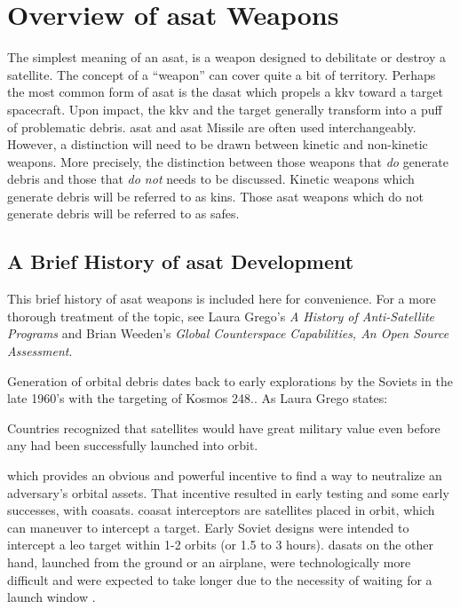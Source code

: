 \section{Overview of \acf{asat} Weapons}

The simplest meaning of an \acf{asat}, is a weapon designed to
debilitate or destroy a satellite.  The concept of a ``weapon'' can
cover quite a bit of territory.  Perhaps the most common form of
\ac{asat} is the \ac{dasat} which propels a \ac{kkv} toward a target
spacecraft.  Upon impact, the \ac{kkv} and the target generally
transform into a puff of problematic debris.  \acs{asat} and
\acs{asat} Missile are often used interchangeably.  However, a
distinction will need to be drawn between kinetic and non-kinetic
weapons.  More precisely, the distinction between those weapons that
\emph{do} generate debris and those that \emph{do not} needs to be
discussed.  Kinetic weapons which generate debris will be referred to
as \acp{kin}.  Those \ac{asat} weapons which do not generate debris
will be referred to as \acp{safe}.

\subsection{A Brief History of \ac{asat} Development}

This brief history of \ac{asat} weapons is included here for
convenience.  For a more thorough treatment of the topic, see Laura
Grego's {\it A History of Anti-Satellite Programs}\cite{grego} and
Brian Weeden's {\it Global Counterspace Capabilities, An Open Source
  Assessment}\cite{brian}.

Generation of orbital debris dates back to early explorations by the
Soviets in the late 1960's with the targeting of Kosmos
248.\cite[05-01]{brian}.  As Laura Grego states:
\begin{blockquote}
  Countries recognized that satellites would have great military value
  even before any had been successfully launched into
  orbit.\cite[2]{grego}
\end{blockquote}
which provides an obvious and powerful incentive to find a way to
neutralize an adversary's orbital assets. That incentive resulted in
early testing and some early successes, with \acp{coasat}.
\acs{coasat} interceptors are satellites placed in orbit, which can
maneuver to intercept a target.  Early Soviet designs were intended to
intercept a \ac{leo} target within 1-2 orbits (or 1.5 to 3 hours).
\acp{dasat} on the other hand, launched from the ground or an
airplane, were technologically more difficult\cite[4]{grego} and were
expected to take longer due to the necessity of waiting for a launch
window \cite[3]{grego}.


